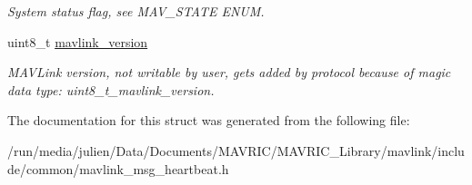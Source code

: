 \begin{DoxyCompactItemize}
\begin{DoxyCompactList}\small\item\em System status flag, see M\+A\+V\+\_\+\+S\+T\+A\+T\+E E\+N\+U\+M. \end{DoxyCompactList}\item 
\hypertarget{struct____mavlink__heartbeat__t_a235d5b6a09fa9b24b3ef7b7a28d15b97}{uint8\+\_\+t \hyperlink{struct____mavlink__heartbeat__t_a235d5b6a09fa9b24b3ef7b7a28d15b97}{mavlink\+\_\+version}}\label{struct____mavlink__heartbeat__t_a235d5b6a09fa9b24b3ef7b7a28d15b97}

\begin{DoxyCompactList}\small\item\em M\+A\+V\+Link version, not writable by user, gets added by protocol because of magic data type\+: uint8\+\_\+t\+\_\+mavlink\+\_\+version. \end{DoxyCompactList}\end{DoxyCompactItemize}


The documentation for this struct was generated from the following file\+:\begin{DoxyCompactItemize}
\item 
/run/media/julien/\+Data/\+Documents/\+M\+A\+V\+R\+I\+C/\+M\+A\+V\+R\+I\+C\+\_\+\+Library/mavlink/include/common/mavlink\+\_\+msg\+\_\+heartbeat.\+h\end{DoxyCompactItemize}
